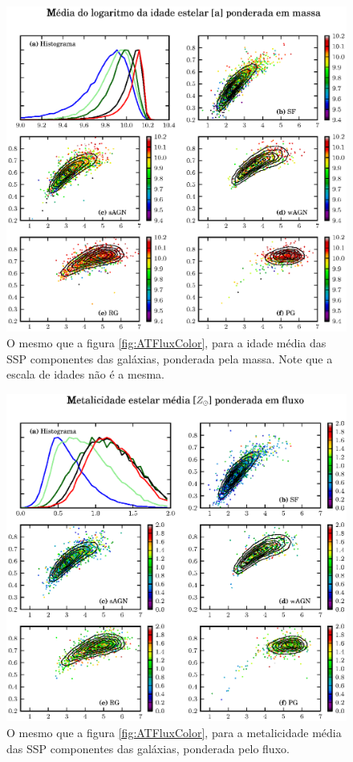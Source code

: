 \begin{figure}
	\includegraphics{figuras/uvcolor-color-at_mass-byclass.eps}
	\caption[Idade média das SSP ponderada em massa no diagrama cor--cor UV.]
	{O mesmo que a figura \ref{fig:ATFluxColor}, para a idade média das SSP
	componentes das galáxias, ponderada pela massa. Note que a escala de idades não
	é a mesma.}
	\label{fig:ATMassColor}
\end{figure}

\begin{figure}
	\includegraphics{figuras/uvcolor-color-am_flux-byclass.eps}
	\caption[Metalicidade média das SSP ponderada em fluxo no diagrama cor--cor
	UV.]
	{O mesmo que a figura \ref{fig:ATFluxColor}, para a metalicidade média das
	SSP componentes das galáxias, ponderada pelo fluxo.}
	\label{fig:AMFluxColor}
\end{figure}

